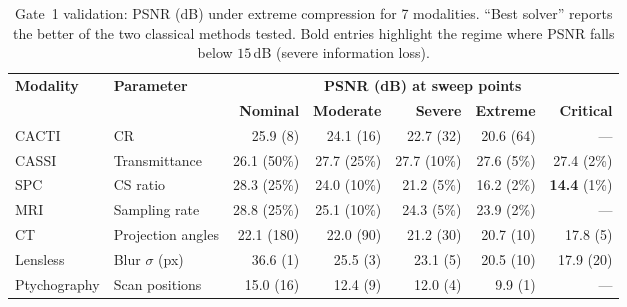 \documentclass[11pt]{article}
\theoremstyle{definition}
\begin{document}
\begin{table}[htbp]
\centering
\caption{Gate~1 validation: PSNR (dB) under extreme compression for 7
modalities.  ``Best solver'' reports the better of the two classical
methods tested.  Bold entries highlight the regime where PSNR falls
below $15$\,dB (severe information loss).}
\label{tab:gate1}
\small
\begin{tabular}{l l r r r r r}
\toprule
\textbf{Modality} & \textbf{Parameter} &
  \multicolumn{5}{c}{\textbf{PSNR (dB) at sweep points}} \\
\cmidrule(lr){3-7}
 & & \textbf{Nominal} & \textbf{Moderate} & \textbf{Severe} & \textbf{Extreme} & \textbf{Critical} \\
\midrule
CACTI & CR
  & 25.9 \scriptsize{(8)} & 24.1 \scriptsize{(16)} & 22.7 \scriptsize{(32)} & 20.6 \scriptsize{(64)} & --- \\
CASSI & Transmittance
  & 26.1 \scriptsize{(50\%)} & 27.7 \scriptsize{(25\%)} & 27.7 \scriptsize{(10\%)} & 27.6 \scriptsize{(5\%)} & 27.4 \scriptsize{(2\%)} \\
SPC & CS ratio
  & 28.3 \scriptsize{(25\%)} & 24.0 \scriptsize{(10\%)} & 21.2 \scriptsize{(5\%)} & 16.2 \scriptsize{(2\%)} & \textbf{14.4} \scriptsize{(1\%)} \\
MRI & Sampling rate
  & 28.8 \scriptsize{(25\%)} & 25.1 \scriptsize{(10\%)} & 24.3 \scriptsize{(5\%)} & 23.9 \scriptsize{(2\%)} & --- \\
CT & Projection angles
  & 22.1 \scriptsize{(180)} & 22.0 \scriptsize{(90)} & 21.2 \scriptsize{(30)} & 20.7 \scriptsize{(10)} & 17.8 \scriptsize{(5)} \\
Lensless & Blur $\sigma$ (px)
  & 36.6 \scriptsize{(1)} & 25.5 \scriptsize{(3)} & 23.1 \scriptsize{(5)} & 20.5 \scriptsize{(10)} & 17.9 \scriptsize{(20)} \\
Ptychography & Scan positions
  & 15.0 \scriptsize{(16)} & 12.4 \scriptsize{(9)} & 12.0 \scriptsize{(4)} & 9.9 \scriptsize{(1)} & --- \\
\bottomrule
\end{tabular}
\end{table}
\end{document}
